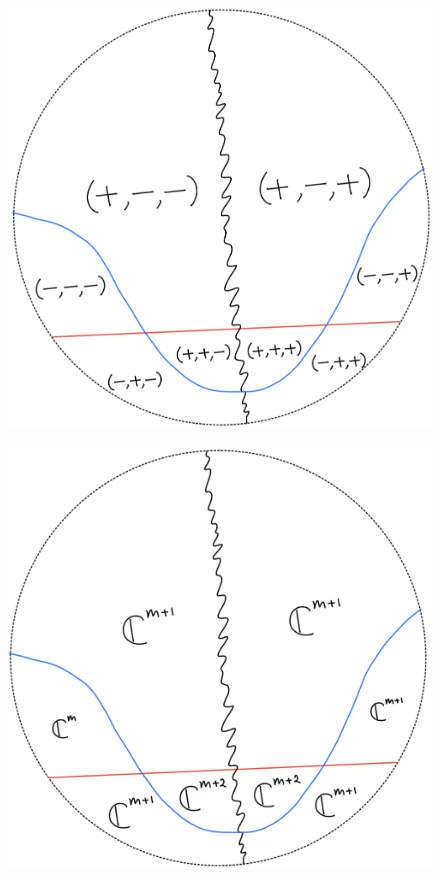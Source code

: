 \begin{figure}[H]
    \centering
    \includegraphics[scale = 0.95]{diagrams/lemma1/26.png} 
    \caption{}
    \label{fig:your-label}
\end{figure}
\begin{figure}[H]
    \centering
    \includegraphics[scale = 0.95]{diagrams/lemma1/27.png} 
    \caption{}
    \label{fig:your-label}
\end{figure}
